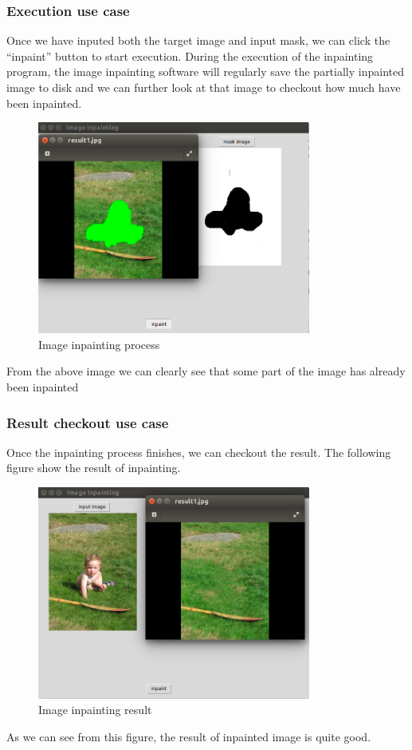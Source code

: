 \subsubsection{Execution use case}
Once we have inputed both the target image and input mask, we can click the ``inpaint'' button to start execution. During the execution of the inpainting program, the image inpainting software will regularly save the partially inpainted image to disk and we can further look at that image to checkout how much have been inpainted.
\begin{figure}[H]
\centering
\includegraphics[width=9cm]{ex_ex.png}
\caption{Image inpainting process}
\end{figure}
From the above image we can clearly see that some part of the image has already been inpainted
\subsubsection{Result checkout use case}
Once the inpainting process finishes, we can checkout the result. The following figure show the result of inpainting.
\begin{figure}[H]
\centering
\includegraphics[width=9cm]{ex_res.png}
\caption{Image inpainting result}
\end{figure}
As we can see from this figure, the result of inpainted image is quite good.


